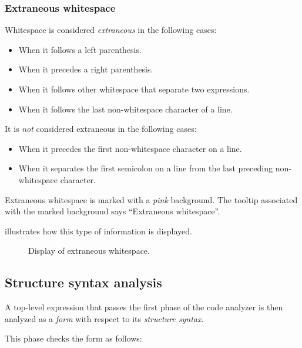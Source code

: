 \subsubsection{Extraneous whitespace}

Whitespace is considered \emph{extraneous} in the following cases: 

\begin{itemize}
\item When it follows a left parenthesis.
\item When it precedes a right parenthesis.
\item When it follows other whitespace that separate two expressions. 
\item When it follows the last non-whitespace character of a line.
\end{itemize}

It is \emph{not} considered extraneous in the following cases:

\begin{itemize}
\item When it precedes the first non-whitespace character on a line. 
\item When it separates the first semicolon on a line from the last
  preceding non-whitespace character. 
\end{itemize}

Extraneous whitespace is marked with a \emph{pink} background.  The
tooltip associated with the marked background says ``Extraneous
whitespace''. 

 illustrates how this type of
information is displayed.

\begin{figure}
\begin{center}
\end{center}
\caption{\label{fig-extraneous-whitespace}
Display of extraneous whitespace.}
\end{figure}

\subsection{Structure syntax analysis}

A top-level expression that passes the first phase of the code
analyzer is then analyzed as a \emph{form} with respect to its
\emph{structure syntax}.

This phase checks the form as follows:

